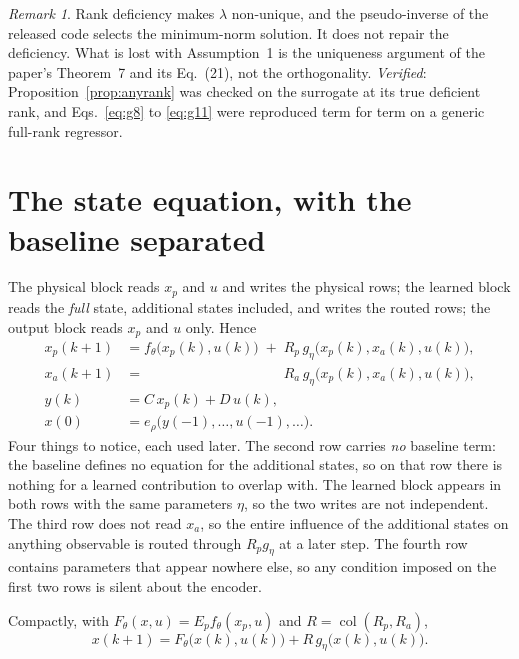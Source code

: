 \documentclass[11pt,a4paper]{article}
\newcommand{\col}{\operatorname{col}}
\theoremstyle{remark}
\newtheorem{remark}[proposition]{Remark}
\begin{document}
\begin{remark}
Rank deficiency makes $\lambda$ non-unique, and the pseudo-inverse of the released code selects
the minimum-norm solution. It does not repair the deficiency. What is lost with Assumption~1 is
the uniqueness argument of the paper's Theorem~7 and its Eq.~(21), not the orthogonality.
\emph{Verified}: Proposition~\ref{prop:anyrank} was checked on the surrogate at its true
deficient rank, and Eqs.~\eqref{eq:g8} to \eqref{eq:g11} were reproduced term for term on a
generic full-rank regressor.
\end{remark}

\section{The state equation, with the baseline separated}\label{sec:state}

The physical block reads $x_p$ and $u$ and writes the physical rows; the learned block reads the
\emph{full} state, additional states included, and writes the routed rows; the output block reads
$x_p$ and $u$ only. Hence
\begin{equation}\label{eq:model}
\boxed{
\begin{aligned}
 x_p(k+1)&=f_\theta\bigl(x_p(k),u(k)\bigr)\;+\;R_p\,g_\eta\bigl(x_p(k),x_a(k),u(k)\bigr),\\
 x_a(k+1)&=\phantom{f_\theta\bigl(x_p(k),u(k)\bigr)\;+\;}R_a\,g_\eta\bigl(x_p(k),x_a(k),u(k)\bigr),\\
 y(k)&=C\,x_p(k)+D\,u(k),\\
 x(0)&=e_\rho\bigl(y(-1),\dots,u(-1),\dots\bigr).
\end{aligned}}
\end{equation}
Four things to notice, each used later. The second row carries \emph{no} baseline term: the
baseline defines no equation for the additional states, so on that row there is nothing for a
learned contribution to overlap with. The learned block appears in both rows with the same
parameters $\eta$, so the two writes are not independent. The third row does not read $x_a$, so
the entire influence of the additional states on anything observable is routed through $R_pg_\eta$
at a later step. The fourth row contains parameters that appear nowhere else, so any condition
imposed on the first two rows is silent about the encoder.

Compactly, with $F_\theta(x,u)=E_pf_\theta(x_p,u)$ and $R=\col(R_p,R_a)$,
\begin{equation}\label{eq:compact}
 x(k+1)=F_\theta\bigl(x(k),u(k)\bigr)+R\,g_\eta\bigl(x(k),u(k)\bigr).
\end{equation}
\end{document}
